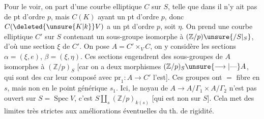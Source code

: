 Pour le voir, on part d'une courbe elliptique
 $C$ sur $S$, telle que dans  il n'y ait
pas de pt d'ordre $p$, mais $C(K)$
ayant un pt d'ordre $p$, donc $C(\deleted{\unsure{K|k}}V)$
a un pt d'ordre $p$, soit $\eta$. On
prend une courbe elliptique $C'$ sur $S$
contenant un sous-groupe isomorphe à $(\mathbb Z/p)\unsure{/S|_S}$,
d'où une section $\xi$ de $C'$. On
pose $A=C'\times_V C$, on y considère
les sections $\alpha=(\xi,e)$, $\beta=(\xi,\eta)$. Ces
sections engendrent des sous-groupes  de
$A$ isomorphes à $(\mathbb Z/p)_S$ [car
on a deux morphismes $(\mathbb Z/p)_S\unsure{\longrightarrow|\text{---}}A$,
qui sont des  car leur composé avec $\mathrm{pr}_1:A\longrightarrow C'$ l'est].
Ces groupes ont $=$  fibre en $s$, mais non
en le point générique $s_1$. Ici,
le noyau de $A\longrightarrow A/\Gamma_1\times A/\Gamma_2$ 
n'est pas  ouvert sur $S=\operatorname{Spec} V$, c'est
$S\amalg_s(\mathbb Z/p)_{k(s)}$ [qui est non  sur $S$].
Cela met des limites très strictes aux
améliorations éventuelles du th. de rigidité.
